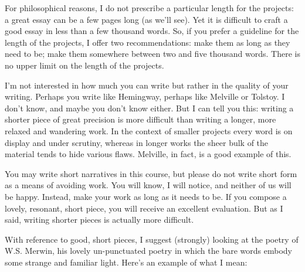 \documentclass[10pt,DIV09,letterpaper,oneside,headsepline]{scrreprt}
\begin{document}
For philosophical reasons, I do not prescribe a particular length for
the projects: a great essay can be a few pages long (as we'll see).
Yet it is difficult to craft a good essay in less than a few thousand
words. So, if you prefer a guideline for the length of the projects, I
offer two recommendations: make them as long as they need to be; make
them somewhere between two and five thousand words. There is no upper
limit on the length of the projects.

I'm not interested in how much you can write but rather in the quality
of your writing. Perhaps you write like Hemingway, perhaps like
Melville or Tolstoy. I don't know, and maybe you don't know either.
But I can tell you this: writing a shorter piece of great precision is
more difficult than writing a longer, more relaxed and wandering work.
In the context of smaller projects every word is on display and under
scrutiny, whereas in longer works the sheer bulk of the material tends
to hide various flaws. Melville, in fact, is a good example of this.

You may write short narratives in this course, but please do not write
short form as a means of avoiding work. You will know, I will notice,
and neither of us will be happy. Instead, make your work as long as it
needs to be. If you compose a lovely, resonant, short piece, you will
receive an excellent evaluation. But as I said, writing shorter pieces
is actually more difficult.

With reference to good, short pieces, I suggest (strongly) looking at
the poetry of W.S. Merwin, his lovely un-punctuated poetry in which
the bare words embody some strange and familiar light. Here's an
example of what I mean:
\end{document}
